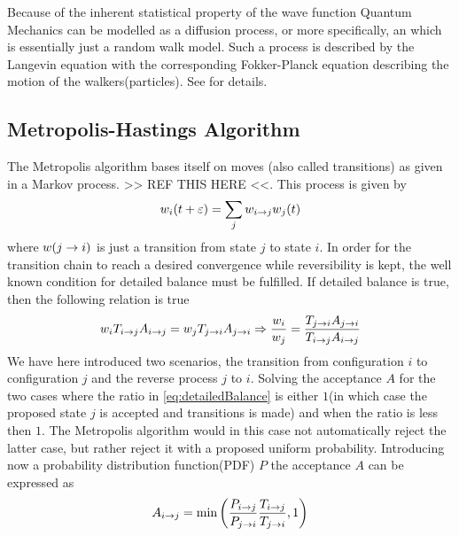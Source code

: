         Because of the inherent statistical property of the wave function
        Quantum Mechanics can be modelled as a diffusion process, or more
        specifically, an  which is
        essentially just a random walk model. Such a process is described by
        the Langevin equation with the corresponding Fokker-Planck equation
        describing the motion of the walkers(particles). See \cite{numstoch}
        for details.

    \subsection{Metropolis-Hastings Algorithm\label{susec:MHAlg}}
        The Metropolis algorithm bases itself on moves (also called
        transitions) as given in a Markov process. >> REF THIS HERE <<. This
        process is given by
            \begin{equation}
                w_i(t+\varepsilon) = \sum_jw_{i\rightarrow j}w_j(t)
            \end{equation}
        where $w(j\rightarrow i)$ is just a transition from state $j$ to state $i$.
        In order for the transition chain to reach a desired convergence while
        reversibility is kept, the well known condition for detailed balance
        must be fulfilled\cite{statmech}. If detailed balance is true, then the
        following relation is true
            \begin{equation}
                w_i T_{i\rightarrow j}A_{i\rightarrow j} = w_j T_{j\rightarrow i}A_{j\rightarrow i}
                \Rightarrow \frac{w_i}{w_j} =
                \frac{T_{j\rightarrow i}A_{j\rightarrow i}}{T_{i\rightarrow j}A_{i\rightarrow j}}
                \label{eq:detailedBalance}
            \end{equation}
        We have here introduced two scenarios, the transition from
        configuration $i$ to configuration $j$ and the reverse process $j$ to
        $i$. Solving the acceptance $A$ for the two cases where the ratio in
        \ref{eq:detailedBalance} is either $1$(in which case the proposed state
        $j$ is accepted and transitions is made) and when the ratio is less
        then $1$. The Metropolis algorithm would in this case not automatically
        reject the latter case, but rather reject it with a proposed uniform
        probability. Introducing now a probability distribution function(PDF) $P$
        the acceptance $A$ can be expressed as
            \begin{equation}
                A_{i\rightarrow j} =
                \text{min}\left(\frac{P_{i\rightarrow j}}{P_{j\rightarrow i}}
                \frac{T_{i\rightarrow j}}{T_{j\rightarrow i}} ,1\right)
                \label{eq:metropolisAcceptance}
            \end{equation}
